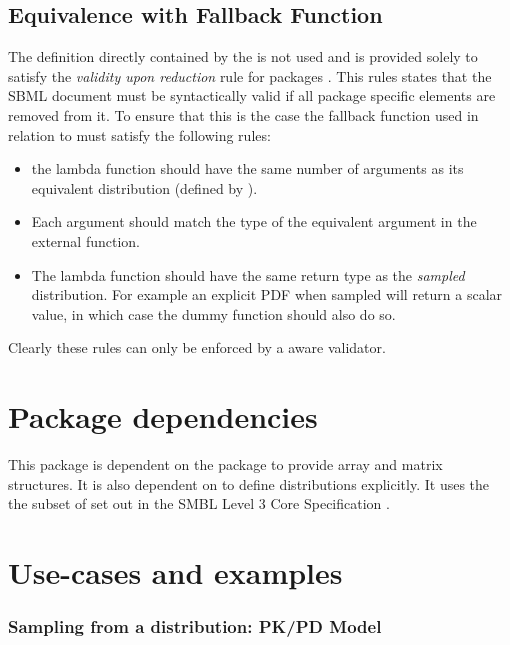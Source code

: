 \documentclass[draftspec]{sbmlpkgspec}
\begin{document}
\subsection{Equivalence with Fallback Function}
\label{sec:fallbackfunc}

The \mathml definition directly contained by the
 is not used and is provided solely to
satisfy the \emph{validity upon reduction} rule for packages
\cite{sbmll3v1packrule}. This rules states that the SBML document must
be syntactically valid if all package specific elements are removed
from it. To ensure that this is the case the fallback function used in
relation to \distribshort must satisfy the following rules:

\begin{itemize}
\item the lambda function should have the same number of arguments as
  its equivalent distribution (defined by \distribshort).
\item Each argument should match the type of the equivalent argument
  in the external function.
\item The lambda function should have the same return type as the
  \emph{sampled} distribution. For example an explicit PDF when
  sampled will return a scalar value, in which case the dummy function
  should also do so.
\end{itemize}

Clearly these rules can only be enforced by a \distribshort aware validator.

\section{Package dependencies}

This package is dependent on the \arrays package to provide array and
matrix structures. It is also dependent on \mathml \cite{mathml2} to
define distributions explicitly. It uses the the subset of \mathml set
out in the SMBL Level 3 Core Specification
\cite{l3v1c}.

\section{Use-cases and examples}

\subsubsection{Sampling from a distribution: PK/PD Model}
\end{document}
